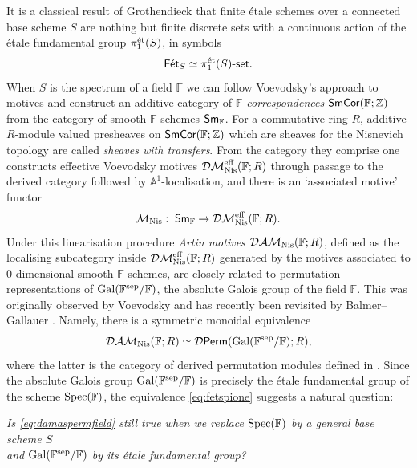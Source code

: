 \documentclass[reqno]{amsart}
\numberwithin{equation}{section}\theoremstyle{thms}
\theoremstyle{defn}
\newcommand{\bA}{\mathbb{A}}
\newcommand{\bF}{\mathbb{F}}
\newcommand{\bZ}{\mathbb{Z}}
\newcommand{\cD}{\mathcal{D}}
\newcommand{\cM}{\mathcal{M}}
\newcommand{\tn}[1]{\textnormal{#1}}
\newcommand{\tsf}[1]{\textsf{\textup{#1}}}
\newcommand{\mcal}[1]{\mathcal{#1}}
\newcommand{\Spec}{\tn{Spec}}
\newcommand{\fets}{\tsf{Fét}_S}
\begin{document}
It is a classical result of Grothendieck \cite[§5, Théorème 4.1]{sga1} that finite étale schemes over a connected base scheme $S$ are nothing but finite discrete sets with a continuous action of the étale fundamental group $\pi_1^{\tn{ét}}(S)$, in symbols
\begin{equation}\label{eq:fetspione}
\fets \simeq \pi_1^{\tn{ét}}(S)\tsf{-set}.
\end{equation}
When $S$ is the spectrum of a field $\bF$ we can follow Voevodsky's approach to motives and construct an additive category of \emph{$\bF$-correspondences} $\tsf{SmCor}(\bF;\bZ)$ from the category of smooth $\bF$-schemes $\tsf{Sm}_\bF$. For a commutative ring $R$, additive $R$-module valued presheaves on $\tsf{SmCor}(\bF;\bZ)$ which are sheaves for the Nisnevich topology are called \emph{sheaves with transfers}. From the category they comprise one constructs effective Voevodsky motives $\mcal{DM}_{\tn{Nis}}^{\tn{eff}}(\bF;R)$ through passage to the derived category followed by $\bA^1$-localisation, and there is an `associated motive' functor
$$\cM_\tn{Nis}: \; \tsf{Sm}_\bF \to \mcal{DM}_{\tn{Nis}}^{\tn{eff}}(\bF;R).$$
Under this linearisation procedure \emph{Artin motives} $\mcal{DAM}_{\tn{Nis}}(\bF;R)$, defined as the localising subcategory inside $\mcal{DM}_{\tn{Nis}}^{\tn{eff}}(\bF;R)$ generated by the motives associated to $0$-dimensional smooth $\bF$-schemes, are closely related to permutation representations of $\tn{Gal}(\bF^{\tn{sep}}/\bF)$, the absolute Galois group of the field $\bF$. This was originally observed by Voevodsky \cite[§3.4]{voe00} and has recently been revisited by Balmer--Gallauer \cite[§7]{bg23}. Namely, there is a symmetric monoidal equivalence
\begin{equation}\label{eq:damaspermfield}
\mcal{DAM}_{\tn{Nis}}(\bF;R) \simeq \cD\tsf{Perm}(\tn{Gal}(\bF^{\tn{sep}}/\bF);R),
\end{equation}
where the latter is the category of derived permutation modules defined in \cite{bg22a}. 
\noindent Since the absolute Galois group $\tn{Gal}(\bF^{\tn{sep}}/\bF)$ is precisely the étale fundamental group of the scheme $\Spec(\bF)$, the equivalence \ref{eq:fetspione} suggests a natural question:
\vspace{0.2cm}
\begin{center}
\emph{Is \ref{eq:damaspermfield} still true when we replace $\Spec(\bF)$ by a general base scheme $S$ \\ and $\tn{Gal}(\bF^{\tn{sep}}/\bF)$ by its étale fundamental group?}
\end{center}
\end{document}
